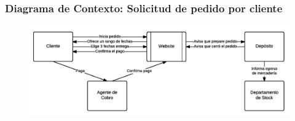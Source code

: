 \clearpage
\subsubsection{Diagrama de Contexto: Solicitud de pedido por cliente}
\begin{figure}[H]
  \includegraphics[width=\linewidth]{images/solicitud-de-pedido-por-cliente.png}
\end{figure}
